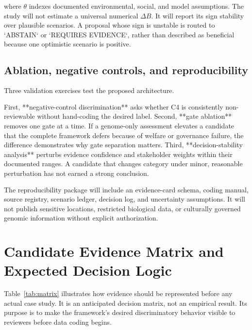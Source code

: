 \documentclass[conference]{IEEEtran}
\begin{document}
where $\theta$ indexes documented environmental, social, and model assumptions. The study will not estimate a universal numerical $\Delta B$. It will report its sign stability over plausible scenarios. A proposal whose sign is unstable is routed to `ABSTAIN` or `REQUIRES EVIDENCE`, rather than described as beneficial because one optimistic scenario is positive.

\subsection{Ablation, negative controls, and reproducibility}

Three validation exercises test the proposed architecture.

First, **negative-control discrimination** asks whether C4 is consistently non-reviewable without hand-coding the desired label. Second, **gate ablation** removes one gate at a time. If a genome-only assessment elevates a candidate that the complete framework defers because of welfare or governance failure, the difference demonstrates why gate separation matters. Third, **decision-stability analysis** perturbs evidence confidence and stakeholder weights within their documented ranges. A candidate that changes category under minor, reasonable perturbation has not earned a strong conclusion.

The reproducibility package will include an evidence-card schema, coding manual, source registry, scenario ledger, decision log, and uncertainty assumptions. It will not publish sensitive locations, restricted biological data, or culturally governed genomic information without explicit authorization.

\section{Candidate Evidence Matrix and Expected Decision Logic}

Table~\ref{tab:matrix} illustrates how evidence should be represented before any actual case study. It is an anticipated decision matrix, not an empirical result. Its purpose is to make the framework's desired discriminatory behavior visible to reviewers before data coding begins.
\end{document}
